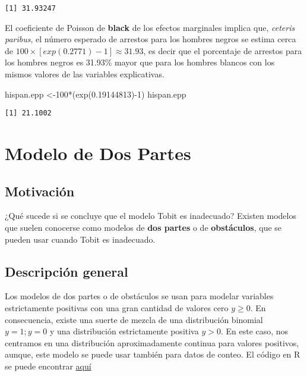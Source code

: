 \documentclass[
  letterpaper,
  DIV=11,
  numbers=noendperiod]{scrreprt}
\newenvironment{Shaded}{\begin{snugshade}}{\end{snugshade}}
\newcommand{\DecValTok}[1]{\textcolor[rgb]{0.68,0.00,0.00}{#1}}
\newcommand{\FloatTok}[1]{\textcolor[rgb]{0.68,0.00,0.00}{#1}}
\newcommand{\FunctionTok}[1]{\textcolor[rgb]{0.28,0.35,0.67}{#1}}
\newcommand{\NormalTok}[1]{\textcolor[rgb]{0.00,0.23,0.31}{#1}}
\newcommand{\OtherTok}[1]{\textcolor[rgb]{0.00,0.23,0.31}{#1}}
\newcommand{\SpecialCharTok}[1]{\textcolor[rgb]{0.37,0.37,0.37}{#1}}
\begin{document}
\begin{verbatim}
[1] 31.93247
\end{verbatim}

El coeficiente de Poisson de \textbf{black} de los efectos marginales
implica que, \emph{ceteris paribus}, el número esperado de arrestos para
los hombres negros se estima cerca de
\(100\times[exp(0.2771)-1]\approx31.93\), es decir que el porcentaje de
arrestos para los hombres negros es 31.93\% mayor que para los hombres
blancos con los mismos valores de las variables explicativas.

\begin{Shaded}
\begin{Highlighting}[]
\NormalTok{hispan.epp }\OtherTok{\textless{}{-}}\DecValTok{100}\SpecialCharTok{*}\NormalTok{(}\FunctionTok{exp}\NormalTok{(}\FloatTok{0.19144813}\NormalTok{)}\SpecialCharTok{{-}}\DecValTok{1}\NormalTok{)}
\NormalTok{hispan.epp}
\end{Highlighting}
\end{Shaded}

\begin{verbatim}
[1] 21.1002
\end{verbatim}


\chapter{Modelo de Dos Partes}\label{modelo-de-dos-partes}

\section{Motivación}\label{motivaciuxf3n-1}

¿Qué sucede si se concluye que el modelo Tobit es inadecuado? Existen
modelos que suelen conocerse como modelos de \textbf{dos partes} o de
\textbf{obstáculos}, que se pueden usar cuando Tobit es inadecuado.

\section{Descripción general}\label{descripciuxf3n-general}

Los modelos de dos partes o de obstáculos se usan para modelar variables
estrictamente positivas con una gran cantidad de valores cero
\(y\geq0\). En consecuencia, existe una suerte de mezcla de una
distribución binomial \(y=1;y=0\) y una distribución estrictamente
positiva \(y>0\). En este caso, nos centramos en una distribución
aproximadamente continua para valores positivos, aunque, este modelo se
puede usar también para datos de conteo. El código en R se puede
encontrar
\href{https://raw.githubusercontent.com/dincerti/dincerti.github.io/master/_rmd-posts/twopart.R}{aquí}
\end{document}
